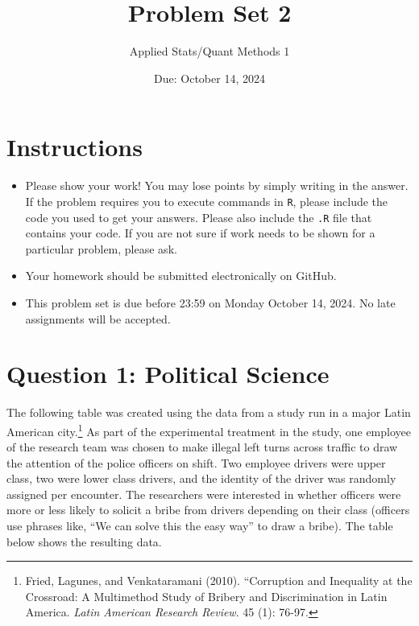\documentclass[12pt,letterpaper]{article}
\title{Problem Set 2}
\date{Due: October 14, 2024}
\author{Applied Stats/Quant Methods 1}
\begin{document}
	\maketitle
	\section*{Instructions}
\begin{itemize}
	\item Please show your work! You may lose points by simply writing in the answer. If the problem requires you to execute commands in \texttt{R}, please include the code you used to get your answers. Please also include the \texttt{.R} file that contains your code. If you are not sure if work needs to be shown for a particular problem, please ask.
	\item Your homework should be submitted electronically on GitHub.
	\item This problem set is due before 23:59 on Monday October 14, 2024. No late assignments will be accepted.

\end{itemize}

	
	\vspace{.5cm}
	\section*{Question 1: Political Science}
		\vspace{.25cm}
	The following table was created using the data from a study run in a major Latin American city.\footnote{Fried, Lagunes, and Venkataramani (2010). ``Corruption and Inequality at the Crossroad: A Multimethod Study of Bribery and Discrimination in Latin America. \textit{Latin American Research Review}. 45 (1): 76-97.} As part of the experimental treatment in the study, one employee of the research team was chosen to make illegal left turns across traffic to draw the attention of the police officers on shift. Two employee drivers were upper class, two were lower class drivers, and the identity of the driver was randomly assigned per encounter. The researchers were interested in whether officers were more or less likely to solicit a bribe from drivers depending on their class (officers use phrases like, ``We can solve this the easy way'' to draw a bribe). The table below shows the resulting data.
\end{document}
